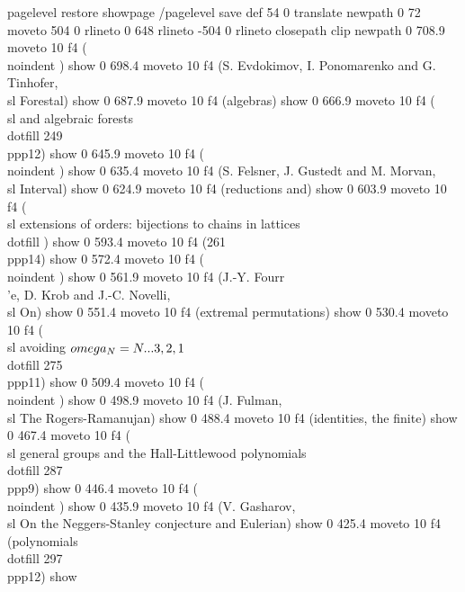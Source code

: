 pagelevel restore
showpage
/pagelevel save def
54 0 translate
newpath 0 72 moveto 504 0 rlineto 0 648 rlineto -504 0 rlineto  closepath clip newpath
0 708.9 moveto
10 f4
(\\noindent     ) show
0 698.4 moveto
10 f4
(S. Evdokimov, I. Ponomarenko and G. Tinhofer,  {\\sl Forestal) show
0 687.9 moveto
10 f4
(algebras}) show
0 666.9 moveto
10 f4
({\\sl  and algebraic forests}\\dotfill   249\\ppp{12}) show
0 645.9 moveto
10 f4
(\\noindent     ) show
0 635.4 moveto
10 f4
(S. Felsner, J. Gustedt and M. Morvan,  {\\sl Interval) show
0 624.9 moveto
10 f4
(reductions and}) show
0 603.9 moveto
10 f4
({\\sl extensions of orders: bijections to chains in lattices}\\dotfill  ) show
0 593.4 moveto
10 f4
(261\\ppp{14}) show
0 572.4 moveto
10 f4
(\\noindent     ) show
0 561.9 moveto
10 f4
(J.-Y. Fourr\\'e, D. Krob and J.-C. Novelli,  {\\sl On) show
0 551.4 moveto
10 f4
(extremal permutations}) show
0 530.4 moveto
10 f4
({\\sl  avoiding $\\omega_N=N ... 3\\, 2\\, 1$}\\dotfill  275\\ppp{11}) show
0 509.4 moveto
10 f4
(\\noindent ) show
0 498.9 moveto
10 f4
(J. Fulman, {\\sl The Rogers-Ramanujan) show
0 488.4 moveto
10 f4
(identities, the finite}) show
0 467.4 moveto
10 f4
({\\sl general groups and the Hall-Littlewood polynomials}\\dotfill 287\\ppp{9}) show
0 446.4 moveto
10 f4
(\\noindent     ) show
0 435.9 moveto
10 f4
(V. Gasharov,  {\\sl On the Neggers-Stanley conjecture and Eulerian) show
0 425.4 moveto
10 f4
(polynomials}\\dotfill   297\\ppp{12}) show
